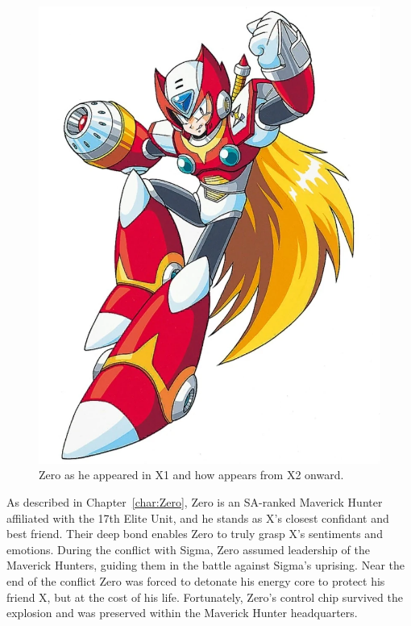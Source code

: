 \begin{figure}[htp]
	\includegraphics[height=\portraitsize]{figures/X2/Hunter_stages/Zero.png}
	\caption{Zero as he appeared in X1 and how appears from X2 onward.}
\end{figure}

As described in Chapter~\ref{char:Zero}, Zero is an SA-ranked Maverick Hunter affiliated with the 17th Elite Unit, and he stands as X's closest confidant and best friend. Their deep bond enables Zero to truly grasp X's sentiments and emotions. During the conflict with Sigma, Zero assumed leadership of the Maverick Hunters, guiding them in the battle against Sigma's uprising. Near the end of the conflict Zero was forced to detonate his energy core to protect his friend X, but at the cost of his life. Fortunately, Zero's control chip survived the explosion and was preserved within the Maverick Hunter headquarters.

